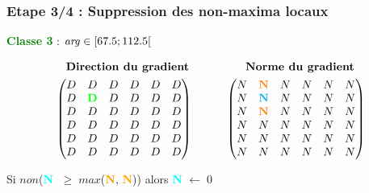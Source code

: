\documentclass{beamer}
\begin{document}
\begin{frame}
\frametitle{Etape 3/4 : Suppression des non-maxima locaux}

\begin{center}
\textcolor{green}{\textbf{Classe 3}} : $ \text{\emph{arg}} \in [67.5; 112.5[ $
\end{center}

\begin{align*}
& \quad \textbf{Direction du gradient} \qquad \qquad \quad \textbf{Norme du gradient} \\
& \begin{pmatrix}
D & D & D & D & D & D \\
D & \textcolor{green}{\textbf{D}} & D & D & D & D \\
D & D & D & D & D & D \\
D & D & D & D & D & D \\
D & D & D & D & D & D \\
D & D & D & D & D & D \\
\end{pmatrix}
\qquad \quad
\begin{pmatrix}
N & \textcolor{orange}{\textbf{N}} & N & N & N & N \\
N & \textcolor{cyan}{\textbf{N}} & N & N & N & N \\
N & \textcolor{orange}{\textbf{N}} & N & N & N & N \\
N & N & N & N & N & N \\
N & N & N & N & N & N \\
N & N & N & N & N & N \\
\end{pmatrix}
\end{align*}

\begin{center}
Si $ non $(\textbf{\textcolor{cyan}{N}} $ \; \geq \; max $(\textbf{\textcolor{orange}{N}}, \textbf{\textcolor{orange}{N}})) alors \textbf{\textcolor{cyan}{N}} $ \leftarrow \; 0 $
\end{center}
\end{frame}
\end{document}
